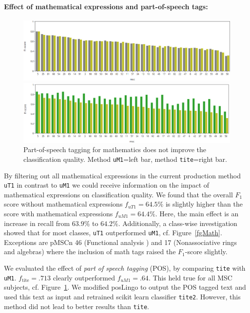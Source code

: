 \paragraph{Effect of mathematical expressions and part-of-speech tags:}
\begin{figure}[t]
  \centering
  \includegraphics[width=\textwidth]{mathEncoding.png}
  \caption{Mathematical symbols in \texttt{title} and abstract \texttt{text} do not improve the classification quality. Method \texttt{uT1} =left bar; method \texttt{uM1}=right bar%
 }\label{fgMath}
  \includegraphics[width=\textwidth]{POSeffekt.png}
\caption{Part-of-speech tagging for mathematics does not improve the classification quality. Method \texttt{uM1}=left bar, method \texttt{tite}=right bar.}\label{fgPOS}
\end{figure}
By filtering out all mathematical expressions in the current production method \texttt{uT1} in contrast to \texttt{uM1} we could receive information on the impact of mathematical expressions on classification quality.
We found that the overall \(F_{1}\) score without mathematical expressions \(f_{uT1} = 64.5\%\) is slightly higher than the score with mathematical expressions \(f_{uM1} = 64.4\%.\)
Here, the main effect is an increase in recall from \(63.9\%\) to \(64.2\%.\)
Additionally, a class-wise investigation showed that for most classes, \texttt{uT1} outperformed \texttt{uM1}, cf. Figure~\ref{fgMath}.
Exceptions are pMSCn 46 (Functional analysis ) and 17 (Nonassociative rings and algebras) where the inclusion of math tags raised the \(F_{1}\)-score slightly.

We evaluated the effect of \emph{part of speech tagging} (POS), by comparing \texttt{tite} with \texttt{uM1}. \(f_{\mathrm{tite}} = .713\) clearly outperformed \(f_{uM1} = .64.\)
This held true for all MSC subjects, cf. Figure~\ref{fgPOS}.
We modified posLingo to output the POS tagged text and used this text as input and retrained scikit learn classifier \texttt{tite2}.
However, this method did not lead to better results than \texttt{tite}.

